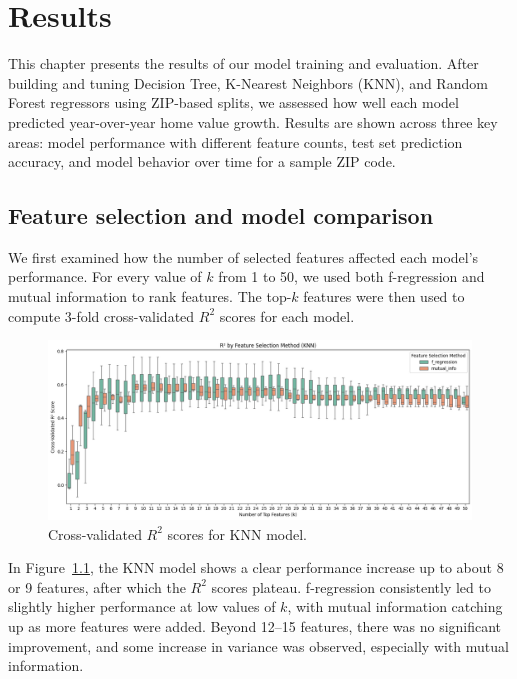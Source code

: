 \chapter{Results}
\label{ch:results}

This chapter presents the results of our model training and evaluation. After building and tuning Decision Tree, K-Nearest Neighbors (KNN), and Random Forest regressors using ZIP-based splits, we assessed how well each model predicted year-over-year home value growth. Results are shown across three key areas: model performance with different feature counts, test set prediction accuracy, and model behavior over time for a sample ZIP code.

\section{Feature selection and model comparison}

We first examined how the number of selected features affected each model's performance. For every value of $k$ from 1 to 50, we used both f-regression and mutual information to rank features. The top-$k$ features were then used to compute 3-fold cross-validated $R^2$ scores for each model.

\begin{figure}[!ht]
    \centering
    \includegraphics[width=\textwidth]{figures/box50_KNN.png}
    \caption{Cross-validated $R^2$ scores for KNN model.}
    \label{fig:box_knn}
\end{figure}
\FloatBarrier

In Figure~\ref{fig:box_knn}, the KNN model shows a clear performance increase up to about 8 or 9 features, after which the $R^2$ scores plateau. f-regression consistently led to slightly higher performance at low values of $k$, with mutual information catching up as more features were added. Beyond 12–15 features, there was no significant improvement, and some increase in variance was observed, especially with mutual information.

